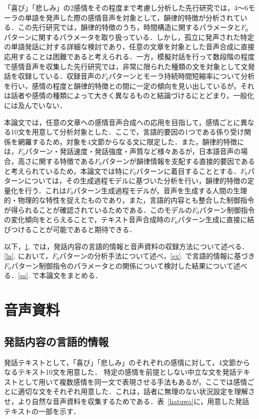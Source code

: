 \documentclass[japanese]{jnlp_1.3b}
\begin{document}
「喜び」「悲しみ」の2感情をその程度まで考慮し分析した先行研究\cite{MD}では，4〜6モーラの単語を発声した際の感情音声を対象として，韻律的特徴が分析されている．この先行研究では，韻律的特徴のうち，時間構造に関するパラメータと$F_0$パターンに関するパラメータを取り扱っている．しかし，孤立に発声された特定の単語発話に対する詳細な検討であり，任意の文章を対象とした音声合成に直接応用することは困難であると考えられる．一方，模擬対話を行って数段階の程度で感情音声を収集した先行研究\cite{Kawana}では，非常に限られた種類の文を対象として文発話を収録している．収録音声の$F_0$パターンとモーラ持続時間短縮率について分析を行い，感情の程度と韻律的特徴との間に一定の傾向を見い出しているが，それは話者や感情の種類によって大きく異なるものと結論づけるにとどまり，一般化には及んでいない．

本論文では，任意の文章への感情音声合成への応用を目指して，感情ごとに異なる10文を用意して分析対象とした．ここで，言語的要因の1つである係り受け関係を網羅するため，対象を4文節からなる文に限定した．また，韻律的特徴には，$F_0$パターン・発話速度・発話強度・声質など様々あるが，日本語音声の場合，高さに関する特徴である$F_0$パターンが韻律情報を支配する直接的要因であると考えられているため，本論文では特に$F_0$パターンに着目することとする．$F_0$パターンについては，その生成過程モデル\cite{Fuji3}に基づいた分析を行い，韻律的特徴の定量化を行う．これは$F_0$パターン生成過程モデルが，音声を生成する人間の生理的・物理的な特性を捉えたものであり，また，言語的内容とも整合した制御指令が得られることが確認されているためである．このモデルの$F_0$パターン制御指令の変化傾向をとらえることで，テキスト音声合成時の$F_0$パターン生成に直接に結びつけることが可能であると期待できる．

以下，\ref{mt}. では，発話内容の言語的情報と音声資料の収録方法について述べる．\ref{ln}. において，$F_0$パターンの分析手法について述べ，\ref{ex}. で言語的情報に基づき$F_0$パターン制御指令のパラメータとの関係について検討した結果について述べる．\ref{sa}. で本論文をまとめる．

\section{音声資料}\label{mt}

\subsection{発話内容の言語的情報}\label{yoso}

発話テキストとして，「喜び」「悲しみ」のそれぞれの感情に対して，4文節からなるテキスト10文を用意した．
特定の感情を前提としない中立な文を発話テキストとして用いて複数感情を同一文で表現させる手法もあるが，ここでは感情ごとに適切な文をそれぞれ用意した．これは，話者に無理のない状況設定を理解させ，より自然な音声資料を収集するためである．表~\ref{hatuwa}に，用意した発話テキストの一部を示す．
\end{document}
